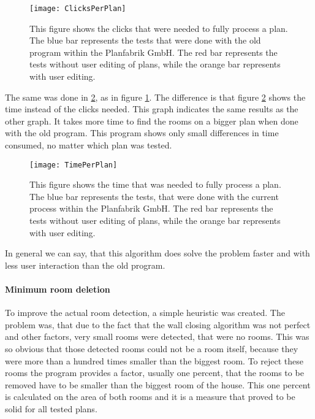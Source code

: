 \begin{figure}[H]
	\centering
	\texttt{[image: ClicksPerPlan]}
	\caption{This figure shows the clicks that were needed to fully process a plan. The blue bar represents the tests that were done with the old program within the Planfabrik GmbH. The red bar represents the tests without user editing of plans, while the orange bar represents with user editing.}
	\label{fig:ClicksPerPlan}
\end{figure}

The same was done in \ref{fig:TimePerPlan}, as in figure \ref{fig:ClicksPerPlan}. The difference is that figure \ref{fig:TimePerPlan} shows the time instead of the clicks needed. This graph indicates the same results as the other graph. It takes more time to find the rooms on a bigger plan when done with the old program. This program shows only small differences in time consumed, no matter which plan was tested. 

\begin{figure}[H]
	\centering
	\texttt{[image: TimePerPlan]}
	\caption{This figure shows the time that was needed to fully process a plan. The blue bar represents the tests, that were done with the current process within the Planfabrik GmbH. The red bar represents the tests without user editing of plans, while the orange bar represents with user editing.}
	\label{fig:TimePerPlan}
\end{figure}

In general we can say, that this algorithm does solve the problem faster and with less user interaction than the old program.

\paragraph{Minimum room deletion}
\label{sub:MinimumRoom}
To improve the actual room detection, a simple heuristic was created. The problem was, that due to the fact that the wall closing algorithm was not perfect and other factors, very small rooms were detected, that were no rooms. This was so obvious that those detected rooms could not be a room itself, because they were more than a hundred times smaller than the biggest room.
To reject these rooms the program provides a factor, usually one percent, that the rooms to be removed have to be smaller than the biggest room of the house. This one percent is calculated on the area of both rooms and it is a measure that proved to be solid for all tested plans.

